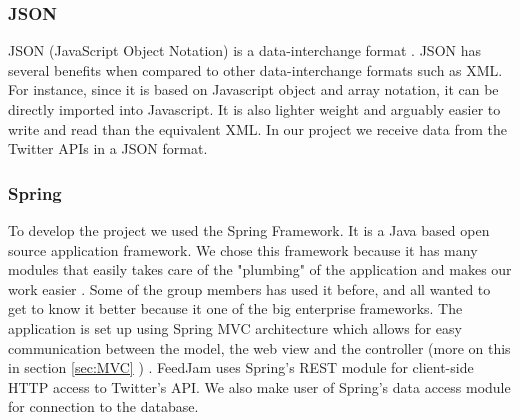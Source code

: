 \subsubsection{JSON}
JSON (JavaScript Object Notation) is a data-interchange format \cite{Crockford2011}. JSON has several benefits when compared to other data-interchange formats such as XML. For instance, since it is based on Javascript object and array notation, it can be directly imported into Javascript. It is also lighter weight and arguably easier to write and read than the equivalent XML. In our project we receive data from the Twitter APIs in a JSON format.

\subsubsection{Spring} %
To develop the project we used the Spring Framework. It is a Java based open source application framework. We chose this framework because it has many modules that easily takes care of the "plumbing" of the application and makes our work easier \citep{SpringSourcea}. Some of the group members has used it before, and all wanted to get to know it better because it one of the big enterprise frameworks. The application is set up using Spring MVC architecture which allows for easy communication between the model, the web view and the controller (more on this in section \ref{sec:MVC} ) \citep{SpringSourced}. FeedJam uses Spring's REST module for client-side HTTP access to Twitter's API. We also make user of Spring's data access module for connection to the database.
